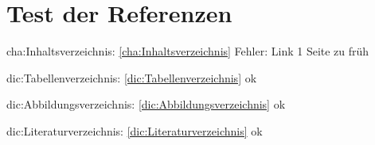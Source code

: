 \section{Test der Referenzen}
\label{sec:Referenzen}

cha:Inhaltsverzeichnis:    \vref{cha:Inhaltsverzeichnis}
Fehler: Link 1 Seite zu früh

dic:Tabellenverzeichnis:   \vref{dic:Tabellenverzeichnis}   ok

dic:Abbildungsverzeichnis: \vref{dic:Abbildungsverzeichnis} ok

dic:Literaturverzeichnis:  \vref{dic:Literaturverzeichnis}  ok

\Endchapter
